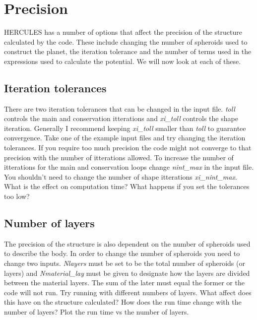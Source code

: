 \documentclass[11pt, oneside]{article}   	%
\begin{document}
\section{Precision}
\label{sec:precision}

HERCULES has a number of options that affect the precision of the structure calculated by the code. These include changing the number of spheroids used to construct the planet, the iteration tolerance and the number of terms used in the expressions used to calculate the potential. We will now look at each of these.


\subsection{Iteration tolerances}

There are two iteration tolerances that can be changed in the input file. {\it toll} controls the main and conservation itterations and {\it xi\_toll} controls the shape iteration. Generally I recommend keeping {\it xi\_toll} smaller than {\it toll} to guarantee convergence. Take one of the example input files and try changing the iteration tolerances. If you require too much precision the code might not converge to that precision with the number of itterations allowed. To increase the number of itterations for the main and conservation loops change {\it nint\_max} in the input file. You shouldn't need to change the number of shape itterations {\it xi\_nint\_max}. What is the effect on computation time? What happens if you set the tolerances too low? 


\subsection{Number of layers}

The precision of the structure is also dependent on the number of spheroids used to describe the body. In order to change the number of spheroids you need to change two inputs. {\it Nlayers } must be set to be the total number of spheroids (or layers) and {\it Nmaterial\_lay} must be given to designate how the layers are divided between the material layers. The sum of the later must equal the former or the code will not run. Try running with different numbers of layers. What affect does this have on the structure calculated? How does the run time change with the number of layers? Plot the run time vs the number of layers.
\end{document}
